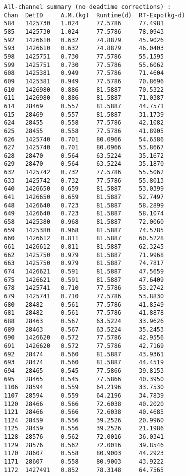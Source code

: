 \documentclass[notitlepage,rmp,aps,10pt]{revtex4-1}
\begin{document}
\begin{verbatim}
All-channel summary (no deadtime corrections) :
Chan  DetID     A.M.(kg)  Runtime(d)  RT-Expo(kg-d)
584   1425730   1.024     77.5786     77.4981
585   1425730   1.024     77.5786     78.0943
592   1426610   0.632     74.8879     45.9026
593   1426610   0.632     74.8879     46.0403
598   1425751   0.730     77.5786     55.1595
599   1425751   0.730     77.5786     55.6062
608   1425381   0.949     77.5786     71.4604
609   1425381   0.949     77.5786     70.8696
610   1426980   0.886     81.5887     70.5322
611   1426980   0.886     81.5887     71.0387
614   28469     0.557     81.5887     44.7571
615   28469     0.557     81.5887     31.1739
624   28455     0.558     77.5786     42.1082
625   28455     0.558     77.5786     41.8905
626   1425740   0.701     80.0966     54.6586
627   1425740   0.701     80.0966     53.8667
628   28470     0.564     63.5224     35.1672
629   28470     0.564     63.5224     35.1870
632   1425742   0.732     77.5786     55.5062
633   1425742   0.732     77.5786     55.8013
640   1426650   0.659     81.5887     53.0399
641   1426650   0.659     81.5887     52.7497
648   1426640   0.723     81.5887     58.2899
649   1426640   0.723     81.5887     58.1074
658   1425380   0.968     81.5887     72.0060
659   1425380   0.968     81.5887     74.5785
660   1426612   0.811     81.5887     60.5228
661   1426612   0.811     81.5887     62.3245
662   1425750   0.979     81.5887     71.9968
663   1425750   0.979     81.5887     74.7817
674   1426621   0.591     81.5887     47.5659
675   1426621   0.591     81.5887     47.6409
678   1425741   0.710     77.5786     53.2742
679   1425741   0.710     77.5786     53.8830
680   28482     0.561     77.5786     41.8549
681   28482     0.561     77.5786     41.8878
688   28463     0.567     63.5224     33.9626
689   28463     0.567     63.5224     35.2453
690   1426620   0.572     77.5786     42.9556
691   1426620   0.572     77.5786     42.7169
692   28474     0.560     81.5887     43.9361
693   28474     0.560     81.5887     44.4519
694   28465     0.545     77.5866     39.8153
695   28465     0.545     77.5866     40.3950
1106  28594     0.559     64.2196     33.7530
1107  28594     0.559     64.2196     34.7839
1120  28466     0.566     72.6038     40.2020
1121  28466     0.566     72.6038     40.4685
1124  28459     0.556     39.2526     20.9960
1125  28459     0.556     39.2526     21.1986
1128  28576     0.562     72.0016     36.0341
1129  28576     0.562     72.0016     39.8546
1170  28607     0.558     80.9003     44.2923
1171  28607     0.558     80.9003     43.9222
1172  1427491   0.852     78.3148     64.7565

\end{verbatim}
\end{document}
